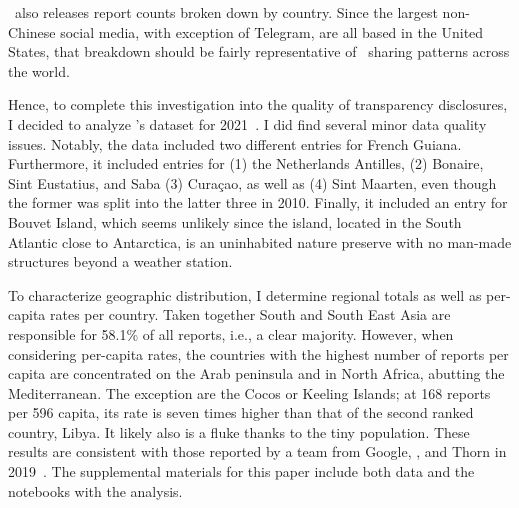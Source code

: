 \NCMEC\ also releases report counts broken down by country. Since the largest
non-Chinese social media, with exception of Telegram, are all based in the
United States, that breakdown should be fairly representative of \CSAM\ sharing
patterns across the world.

Hence, to complete this investigation into the quality of transparency
disclosures, I decided to analyze \NCMEC's dataset for
2021~\cite{NcmecByCountry2021}. I did find several minor data quality issues.
Notably, the data included two different entries for French Guiana. Furthermore,
it included entries for (1) the Netherlands Antilles, (2) Bonaire, Sint
Eustatius, and Saba (3) Curaçao, as well as (4) Sint Maarten, even though the
former was split into the latter three in 2010. Finally, it included an entry
for Bouvet Island, which seems unlikely since the island, located in the South
Atlantic close to Antarctica, is an uninhabited nature preserve with no man-made
structures beyond a weather station.

To characterize geographic distribution, I determine regional totals as well as
per-capita rates per country. Taken together South and South East Asia are
responsible for 58.1\% of all reports, i.e., a clear majority. However, when
considering per-capita rates, the countries with the highest number of reports
per capita are concentrated on the Arab peninsula and in North Africa, abutting
the Mediterranean. The exception are the Cocos or Keeling Islands; at 168
reports per 596 capita, its rate is seven times higher than that of the second
ranked country, Libya. It likely also is a fluke thanks to the tiny population.
These results are consistent with those reported by a team from Google, \NCMEC,
and Thorn in 2019~\cite{BurszteinBrightea2019}. The supplemental materials for
this paper include both data and the notebooks with the analysis.
